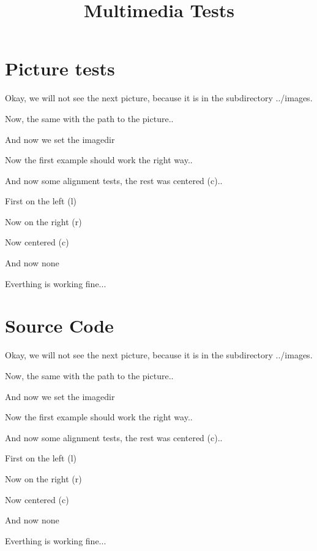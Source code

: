 \documentclass{webpage}
\begin{document}
\title{Multimedia Tests}

\tableofcontents



\section{Picture tests}

Okay, we will not see the next picture, because it is in the subdirectory ../images.

Now, the same with the path to the picture..

And now we set the imagedir

Now the first example should work the right way..

And now some alignment tests, the rest was centered (c)..

First on the left (l)

Now on the right (r)

Now centered (c)

And now none


Everthing is working fine...



\section{Source Code}

\verbatim 

Okay, we will not see the next picture, because it is in the subdirectory ../images.

Now, the same with the path to the picture..

And now we set the imagedir

Now the first example should work the right way..

And now some alignment tests, the rest was centered (c)..

First on the left (l)

Now on the right (r)

Now centered (c)

And now none


Everthing is working fine...
\endverbatim
\end{document}
